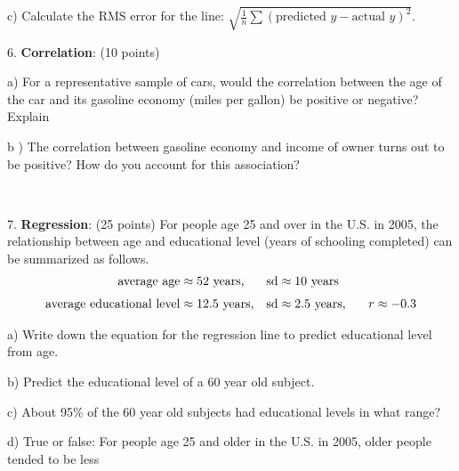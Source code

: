 \documentclass[10pt]{article}
\begin{document}
\hspace{10pt} c) Calculate the RMS error for the line:
$\displaystyle\sqrt{\frac{1}{n}\sum\left(\mbox{predicted $y$} - \mbox{actual $y$}\right)^2}$.
\vspace{2.5in}


6. \textbf{Correlation}: (10 points) 

\hspace{20pt} a) For a representative sample of cars, would the correlation between the
age of the car and its gasoline economy (miles per gallon) be positive or negative?  Explain
\vspace{1.5in}

\hspace{20pt} b ) The correlation between gasoline economy and income of owner turns out to 
be positive?  How do you account for this association?


\vfill
\eject
{\ }

7. \textbf{Regression}: 
(25 points) For people age 25 and over in the U.S. in 2005, the relationship between
age and educational level (years of schooling completed) can be summarized as
follows. \vspace{-5pt}
\begin{align*}
\mbox{average age}         & \approx \mbox{52 years,}    & \mbox{sd} & \approx \mbox{10 years}\\[3pt]
\mbox{average educational level}  & \approx \mbox{12.5 years,}  & \mbox{sd} & \approx \mbox{2.5 years,
   \hspace{15pt}} r\approx -0.3
\end{align*}\vspace{-5pt}

\hspace{20pt} a) Write down the equation for the regression line  to
predict educational level from age.
\vspace{1.4in}

\hspace{20pt} b) Predict the educational level of a 60 year old subject.
\vspace{1.4in}

\hspace{20pt} c) About 95\% of the 60 year old subjects had educational levels in what range?
\vspace{1.4in}

\hspace{20pt} d) True or false:  For people age 25 and older in the U.S. in 2005, older people tended 
to be less\vspace{-5pt}
\end{document}

